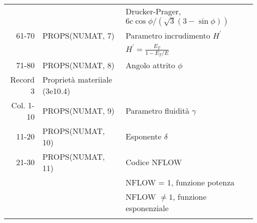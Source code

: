 \begin{tabular}{rll}
	&                                & Drucker-Prager, $6c\cos\phi/(\sqrt{3}(3-\sin\phi))$\\
	61-70    & PROPS(NUMAT, 7)                & Parametro incrudimento $H^{'}$                    \\
	&                                & $H^{'}=\frac{E_T}{1-E_T/E}$\\
	71-80    & PROPS(NUMAT, 8)                & Angolo attrito $\phi$                             \\
	Record 3     & Proprietà materiiale (3e10.4)  &                                                   \\
	Col. 1-10    & PROPS(NUMAT,  9)               & Parametro fluidità $\gamma$                       \\
	11-20    & PROPS(NUMAT, 10)               & Esponente $\delta$                                \\
	21-30    & PROPS(NUMAT, 11)               & Codice NFLOW                                      \\
	&                                & NFLOW = 1, funzione potenza                       \\
	&                                & NFLOW $\neq 1$, funzione esponenziale             \\	             
	&                                &                                                   \\	             
\end{tabular}

